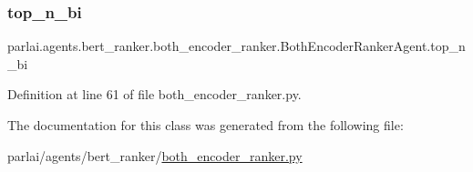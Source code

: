 \subsubsection{\texorpdfstring{top\+\_\+n\+\_\+bi}{top\_n\_bi}}
{\footnotesize\ttfamily parlai.\+agents.\+bert\+\_\+ranker.\+both\+\_\+encoder\+\_\+ranker.\+Both\+Encoder\+Ranker\+Agent.\+top\+\_\+n\+\_\+bi}



Definition at line 61 of file both\+\_\+encoder\+\_\+ranker.\+py.



The documentation for this class was generated from the following file\+:\begin{DoxyCompactItemize}
\item 
parlai/agents/bert\+\_\+ranker/\hyperlink{both__encoder__ranker_8py}{both\+\_\+encoder\+\_\+ranker.\+py}\end{DoxyCompactItemize}
